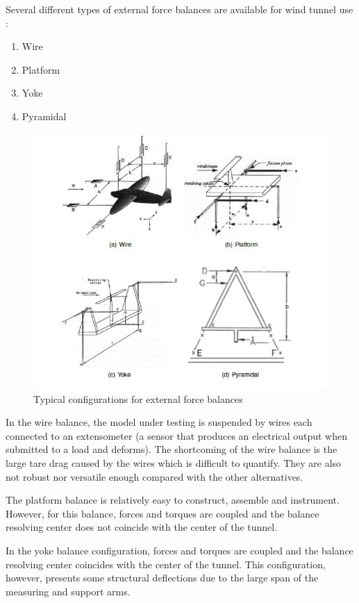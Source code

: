 Several different types of external force balances are available for wind tunnel use
\cite{morris_force_2010}:
\begin{enumerate}
\item Wire
\item Platform
\item Yoke
\item Pyramidal
\end{enumerate}
\begin{center}
	\begin{figure}[!h]
	\centering
	\includegraphics{Figures/Fig6}
	\caption{Typical configurations for external force balances}
	\end{figure}
\end{center}
In the wire balance, the model under testing is suspended by wires each connected to an extensometer (a sensor that produces an electrical output when submitted to a load and deforms). The shortcoming of the wire balance is the large tare drag caused by the wires which is difficult to quantify. They are also not robust nor versatile enough compared with the other alternatives. 

The platform balance is relatively easy to construct, assemble and instrument. However, for this balance, forces and torques are coupled and the balance resolving center does not coincide with the center of the tunnel.
 
In the yoke balance configuration, forces and torques are coupled and the balance resolving center coincides with the center of the tunnel. This configuration, however, presents some structural deflections due to the large span of the measuring and support arms.

